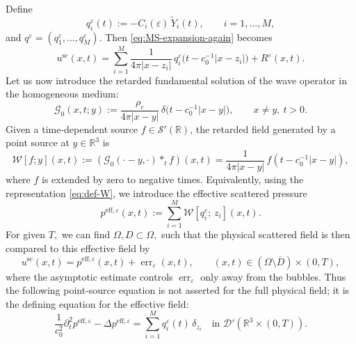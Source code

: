 \documentclass[11pt,a4paper]{article}
\numberwithin{equation}{section}
\newcommand{\R}{\mathbb{R}}
\newcommand{\veps}{\varepsilon}
\begin{document}
\noindent
Define
\[
 q_i^\veps(t):=-C_i(\veps)\,\widetilde{Y}_i(t),\qquad i=1,\dots,M,
\]
and $q^\veps=(q_1^\veps,\dots,q_M^\veps)$. Then \eqref{eq:MS-expansion-again} becomes
\begin{equation}
\label{eq:retarded-actuators}
 u^{\mathrm{sc}}(x,t)
 =
 \sum_{i=1}^M
 \frac{1}{4\pi|x-z_i|}\,q_i^\veps\bigl(t-c_0^{-1}|x-z_i|\bigr)
 + R^\veps(x,t).
\end{equation}
Let us now introduce the retarded fundamental solution of the wave operator in the homogeneous medium:
\begin{equation}
\label{eq:fundamental-wave}
 \mathcal{G}_0(x,t;y)
 :=
 \frac{\rho_c}{4\pi|x-y|}\,\delta\bigl(t-c_0^{-1}|x-y|\bigr),
 \qquad x\neq y,\ t>0.
\end{equation}
Given a time-dependent source $f\in\mathscr{S}'(\R)$, the retarded field generated by a point source at $y\in\R^3$ is
\begin{equation}
\label{eq:def-W}
\mathcal{W}[f;y](x,t) := (\mathcal{G}_0(\cdot - y,\cdot) *_{t} f)(x,t)
= \frac{1}{4\pi |x-y|} \, f\!\left(t - c_0^{-1}|x-y|\right),
\end{equation}
where $f$ is extended by zero to negative times.
Equivalently, using the representation \eqref{eq:def-W}, we introduce the effective scattered pressure
\[
 p^{\mathrm{eff},\veps}(x,t)
 :=
 \sum_{i=1}^M \mathcal{W}[q_i^\veps;\,z_i](x,t).
\]
For given $T,$ we can find $\Omega, D\subset \Omega,$ such that the physical scattered field is then compared to this effective field by
\[
 u^{\mathrm{sc}}(x,t)=p^{\mathrm{eff},\veps}(x,t)+\operatorname{err}_{\veps}(x,t),
 \qquad (x,t)\in (\Omega\setminus\overline D)\times(0,T),
\]
where the asymptotic estimate controls $\operatorname{err}_{\veps}$ only away from the bubbles. Thus the following point-source equation is not asserted for the full physical field; it is the defining equation for the effective field:
\begin{equation}
\label{eq:effective-wave-R3}
 \frac{1}{c_0^2}\partial_t^2 p^{\mathrm{eff},\veps} - \Delta p^{\mathrm{eff},\veps}
 = \sum_{i=1}^M q_i^\veps(t)\,\delta_{z_i}
 \quad\text{in }\mathscr{D}'(\R^3\times(0,T)).
\end{equation}
\end{document}
